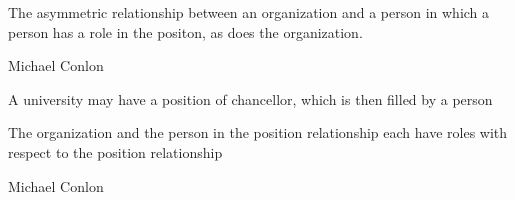 \documentclass[letterpaper,10pt,english]{sphinxmanual}
\begin{document}
\begin{sphinxShadowBox}

\sphinxAtStartPar
{\hyperref[\detokenize{doc-BFO_0000003::doc}]{}}
\end{sphinxShadowBox}

\begin{sphinxShadowBox}

\sphinxAtStartPar
The asymmetric relationship between an organization and a person in which a person has a role in the positon, as does the organization.
\end{sphinxShadowBox}

\begin{sphinxShadowBox}

\sphinxAtStartPar
Michael Conlon 
\end{sphinxShadowBox}

\begin{sphinxShadowBox}

\sphinxAtStartPar
A university may have a position of chancellor, which is then filled by a person
\end{sphinxShadowBox}

\begin{sphinxShadowBox}

\sphinxAtStartPar
The organization and the person in the position relationship each have roles with respect to the position relationship
\end{sphinxShadowBox}

\begin{sphinxShadowBox}

\sphinxAtStartPar
{}
\end{sphinxShadowBox}

\begin{sphinxShadowBox}

\sphinxAtStartPar
Michael Conlon 
\end{sphinxShadowBox}
\begin{quote}

\ignorespaces \end{quote}
\end{document}
